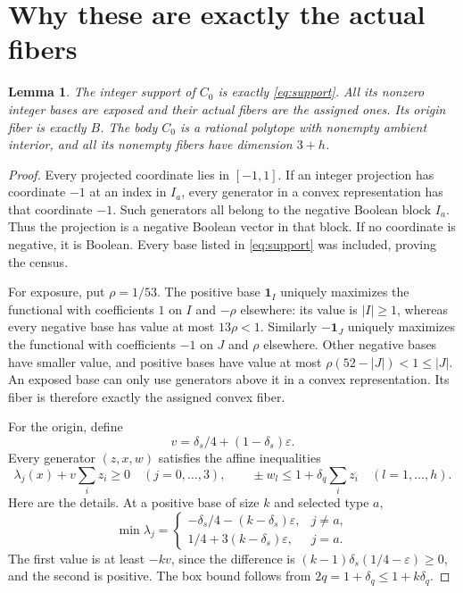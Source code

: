 \documentclass[11pt]{article}
\newtheorem{lemma}{Lemma}
\newcommand{\one}{\mathbf 1}
\begin{document}
\section{Why these are exactly the actual fibers}
\begin{lemma}\label{lem:fibers}
The integer support of $C_0$ is exactly \eqref{eq:support}. All its nonzero
integer bases are exposed and their actual fibers are the assigned ones.
Its origin fiber is exactly $B$. The body $C_0$ is a rational polytope with
nonempty ambient interior, and all its nonempty fibers have dimension $3+h$.
\end{lemma}
\begin{proof}
Every projected coordinate lies in $[-1,1]$. If an integer projection has
coordinate $-1$ at an index in $I_a$, every generator in a convex
representation has that coordinate $-1$. Such generators all belong to
the negative Boolean block $I_a$. Thus the projection is a negative
Boolean vector in that block. If no coordinate is negative, it is Boolean.
Every base listed in \eqref{eq:support} was included, proving the census.

For exposure, put $\rho=1/53$. The positive base $\one_I$ uniquely
maximizes the functional with coefficients $1$ on $I$ and $-\rho$
elsewhere: its value is $|I|\ge1$, whereas every negative base has value
at most $13\rho<1$. Similarly $-\one_J$ uniquely maximizes the functional
with coefficients $-1$ on $J$ and $\rho$ elsewhere. Other negative bases
have smaller value, and positive bases have value at most
$\rho(52-|J|)<1\le|J|$. An exposed base can only use generators above
it in a convex representation. Its fiber is therefore exactly the assigned
convex fiber.

For the origin, define
\[
 v=\delta_s/4+(1-\delta_s)\varepsilon.
\]
Every generator $(z,x,w)$ satisfies the affine inequalities
\begin{equation}\label{eq:envelope}
 \lambda_j(x)+v\sum_i z_i\ge0\quad(j=0,\ldots,3),\qquad
 \pm w_l\le1+\delta_q\sum_i z_i\quad(l=1,\ldots,h).
\end{equation}
Here are the details. At a positive base of size $k$ and selected type $a$,
\[
 \min\lambda_j=
 \begin{cases}
 -\delta_s/4-(k-\delta_s)\varepsilon,&j\ne a,\\
 1/4+3(k-\delta_s)\varepsilon,&j=a.
 \end{cases}
\]
The first value is at least $-kv$, since the difference is
$(k-1)\delta_s(1/4-\varepsilon)\ge0$, and the second is positive.
The box bound follows from $2q=1+\delta_q\le1+k\delta_q$.


\end{proof}
\end{document}
